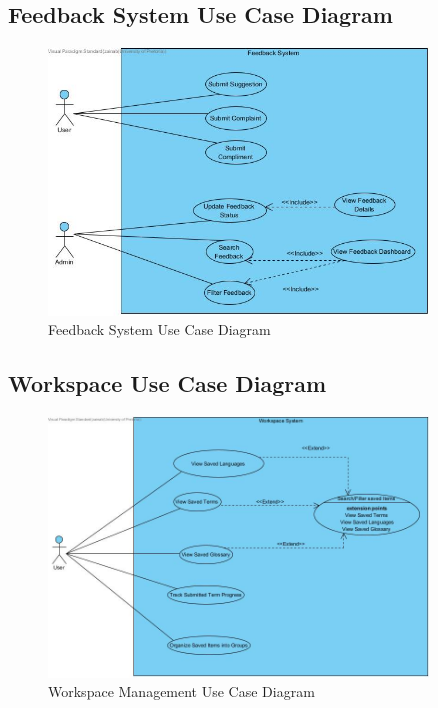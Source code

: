 \documentclass[12pt]{article}
\begin{document}
\subsection{Feedback System Use Case Diagram}
\begin{figure}[H]
  \centering
  \includegraphics[width=0.9\textwidth]{Feedaback system.jpg}
  \caption{Feedback System Use Case Diagram}
  \label{fig:feedback-system-use-case}
\end{figure}

\subsection{Workspace Use Case Diagram}
\begin{figure}[H]
  \centering
  \includegraphics[width=0.9\textwidth]{workspace.jpg}
  \caption{Workspace Management Use Case Diagram}
  \label{fig:workspace-use-case}
\end{figure}
\end{document}
